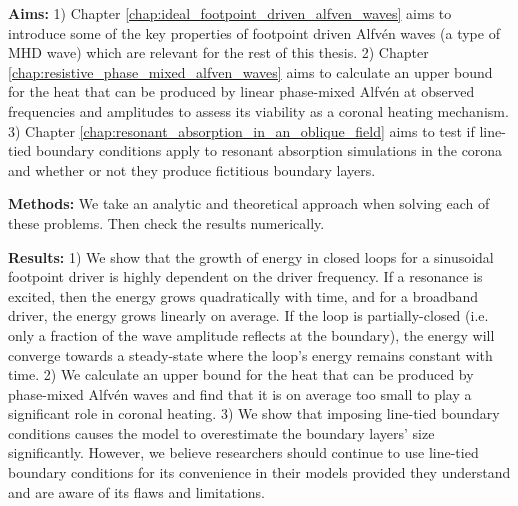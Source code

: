 \begin{spacing}{1.1}
\textbf{Aims:}
1) Chapter \ref{chap:ideal_footpoint_driven_alfven_waves} aims to introduce some of the key properties of footpoint driven Alfv\'en waves (a type of MHD wave) which are relevant for the rest of this thesis.
2) Chapter \ref{chap:resistive_phase_mixed_alfven_waves} aims to calculate an upper bound for the heat that can be produced by linear phase-mixed Alfv\'en at observed frequencies and amplitudes to assess its viability as a coronal heating mechanism.
3) Chapter \ref{chap:resonant_absorption_in_an_oblique_field} aims to test if line-tied boundary conditions apply to resonant absorption simulations in the corona and whether or not they produce fictitious boundary layers.

\textbf{Methods:} We take an analytic and theoretical approach when solving each of these problems. Then check the results numerically.

\textbf{Results:} 1) We show that the growth of energy in closed loops for a sinusoidal footpoint driver is highly dependent on the driver frequency. If a resonance is excited, then the energy grows quadratically with time, and for a broadband driver, the energy grows linearly on average. If the loop is partially-closed (i.e. only a fraction of the wave amplitude reflects at the boundary), the energy will converge towards a steady-state where the loop's energy remains constant with time. 
2) We calculate an upper bound for the heat that can be produced by phase-mixed Alfv\'en waves and find that it is on average too small to play a significant role in coronal heating. 
3) We show that imposing line-tied boundary conditions causes the model to overestimate the boundary layers' size significantly. However, we believe researchers should continue to use line-tied boundary conditions for its convenience in their models provided they understand and are aware of its flaws and limitations.

\end{spacing}
